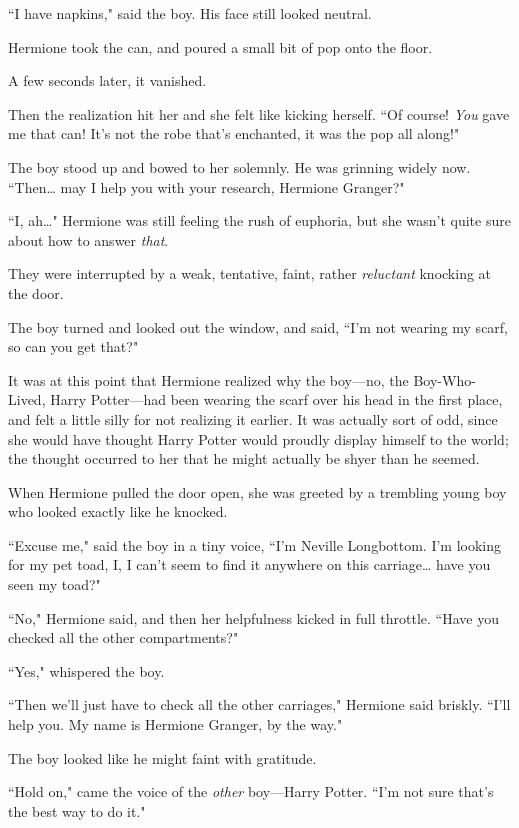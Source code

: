 ``I have napkins," said the boy. His face still looked neutral.

Hermione took the can, and poured a small bit of pop onto the floor.

A few seconds later, it vanished.

Then the realization hit her and she felt like kicking herself. ``Of course! \emph{You} gave me that can! It's not the robe that's enchanted, it was the pop all along!"

The boy stood up and bowed to her solemnly. He was grinning widely now. ``Then{\ldots} may I help you with your research, Hermione Granger?"

``I, ah{\ldots}" Hermione was still feeling the rush of euphoria, but she wasn't quite sure about how to answer \emph{that}.

They were interrupted by a weak, tentative, faint, rather \emph{reluctant} knocking at the door.

The boy turned and looked out the window, and said, ``I'm not wearing my scarf, so can you get that?"

It was at this point that Hermione realized why the boy---no, the Boy-Who-Lived, Harry Potter---had been wearing the scarf over his head in the first place, and felt a little silly for not realizing it earlier. It was actually sort of odd, since she would have thought Harry Potter would proudly display himself to the world; the thought occurred to her that he might actually be shyer than he seemed.

When Hermione pulled the door open, she was greeted by a trembling young boy who looked exactly like he knocked.

``Excuse me," said the boy in a tiny voice, ``I'm Neville Longbottom. I'm looking for my pet toad, I, I can't seem to find it anywhere on this carriage{\ldots} have you seen my toad?"

``No," Hermione said, and then her helpfulness kicked in full throttle. ``Have you checked all the other compartments?"

``Yes," whispered the boy.

``Then we'll just have to check all the other carriages," Hermione said briskly. ``I'll help you. My name is Hermione Granger, by the way."

The boy looked like he might faint with gratitude.

``Hold on," came the voice of the \emph{other} boy---Harry Potter. ``I'm not sure that's the best way to do it."

